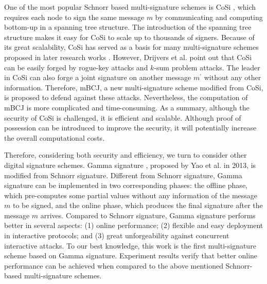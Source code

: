\documentclass[journal]{IEEEtran}
\begin{document}
One of the most popular Schnorr based multi-signature schemes is CoSi \cite{02DBLP:conf/sp/SytaTVWJGGKF16}, which requires each node to sign the same message \(m\) by communicating and computing bottom-up in a spanning tree structure. The introduction of the spanning tree structure makes it easy for CoSi to scale up to thousands of signers. Because of its great scalability, CoSi has served as a basis for many multi-signature schemes proposed in later research works \cite{31alangot2018reliable}\cite{28DBLP:conf/uss/Kokoris-KogiasJ16}\cite{29DBLP:conf/sp/SytaJKGGKFF17}\cite{30DBLP:conf/trustcom/ZhouWQHL16}. However, Drijvers et al. \cite{03drijverssecurity} point out that CoSi can be easily forged by rogue-key attacks and \(k\)-sum problem attacks. The leader in CoSi can also forge a joint signature on another message \(m^\prime\) without any other information. Therefore, mBCJ, a new multi-signature scheme modified from CoSi, is proposed to defend against these attacks. Nevertheless, the computation of mBCJ is more complicated and time-consuming. As a summary, although the security of CoSi is challenged, it is efficient and scalable. Although proof of possession can be introduced to improve the security, it will potentially increase the overall computational costs.

Therefore, considering both security and efficiency, we turn to consider other digital signature schemes. Gamma signature \cite{01DBLP:journals/tifs/YaoZ13}, proposed by Yao et al. in 2013, is modified from Schnorr signature. Different from Schnorr signature, Gamma signature can be implemented in two corresponding phases: the offline phase, which pre-computes some partial values without any information of the message \(m\) to be signed, and the online phase, which produces the final signature after the message \(m\) arrives. Compared to Schnorr signature, Gamma signature performs better in several aspects: (1) online performance; (2) flexible and easy deployment in interactive protocols; and (3) great unforgeability against concurrent interactive attacks. To our best knowledge, this work is the first multi-signature scheme based on Gamma signature. Experiment results verify that better online performance can be achieved when compared to the above mentioned Schnorr-based multi-signature schemes.

\end{document}
